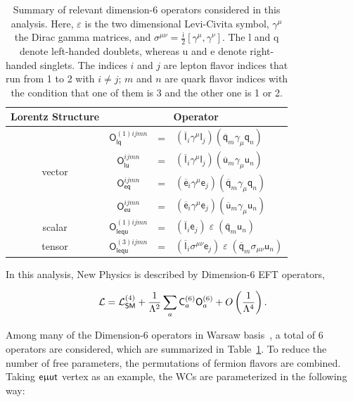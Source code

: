 \begin{table}[t]
\sffamily
\centering
\caption{Summary of relevant dimension-6 operators considered in this analysis. Here, $\varepsilon$ is the two dimensional Levi-Civita symbol, $\gamma^\mu$ the Dirac gamma matrices, and $\sigma^{\mu\nu}=\frac{\textsf{i}}{2}[\gamma^\mu,\gamma^\nu]$. The l and q denote left-handed doublets, whereas u and e denote right-handed singlets. The indices $i$ and $j$ are lepton flavor indices that run from 1 to 2 with $i \neq j$; $m$ and $n$ are quark flavor indices with the condition that one of them is 3 and the other one is 1 or 2.}
\begin{tabular}{cccl}
\toprule
Lorentz Structure & \multicolumn{3}{c}{Operator}\\
\midrule
\multirow{4}{*}{vector} & $\textsf{O}_{\textsf{lq}}^{(1)ijmn}$ &=& $(\overline{\textsf{l}}_i\gamma^\mu\textsf{l}_j)
 (\overline{\textsf{q}}_m\gamma_\mu\textsf{q}_n)$
 \\
 & $\textsf{O}_{\textsf{lu}}^{ijmn}$ &=& $(\overline{\textsf{l}}_i\gamma^\mu\textsf{l}_j)
 (\overline{\textsf{u}}_m\gamma_\mu\textsf{u}_n)$
 \\  
 & $\textsf{O}_{\textsf{eq}}^{ijmn}$ &=& $(\overline{\textsf{e}}_i\gamma^\mu\textsf{e}_j)
 (\overline{\textsf{q}}_m\gamma_\mu\textsf{q}_n)$
 \\ 
 & $\textsf{O}_{\textsf{eu}}^{ijmn}$ &=& $(\overline{\textsf{e}}_i\gamma^\mu\textsf{e}_j)
 (\overline{\textsf{u}}_m\gamma_\mu\textsf{u}_n)$
 \\ \midrule
\multirow{1}{*}{scalar} & $\textsf{O}_{\textsf{lequ}}^{(1)ijmn}$ &=& $(\overline{\textsf{l}}_i\textsf{e}_j)\;\varepsilon\;
 (\overline{\textsf{q}}_m\textsf{u}_n)$
 \\ 
 \multirow{1}{*}{tensor} & $\textsf{O}_{\textsf{lequ}}^{(3)ijmn}$ &=& $(\overline{\textsf{l}}_i \sigma^{\mu\nu}\textsf{e}_j)\;\varepsilon\;
 (\overline{\textsf{q}}_m\sigma_{\mu\nu}\textsf{u}_n)$
 \\ \bottomrule
\end{tabular}
\label{tab:dimension6}
\end{table}

In this analysis, New Physics is described by Dimension-6 \ac{EFT} operators,

\begin{equation}
\label{eq:0}
\mathcal{L}=\mathcal{L}_{\textsf{SM}}^{(4)} + \frac{1}{\mathrm{\Lambda}^2}\sum_{a}\textsf{C}^{(6)}_{a}\textsf{O}^{(6)}_{a}+O\left( \frac{1}{\mathrm{\Lambda}^4}\right).
\end{equation}  

Among many of the Dimension-6 operators in Warsaw basis~\cite{Grzadkowski:2010es,Aguilar-Saavedra:2018ksv}, a total of 6 operators are considered, which are summarized in Table~\ref{tab:dimension6}. To reduce the number of free parameters, the permutations of fermion flavors are combined. Taking $\textsf{e}\upmu\textsf{{u}t}$ vertex as an example, the \acp{WC} are parameterized in the following way:

